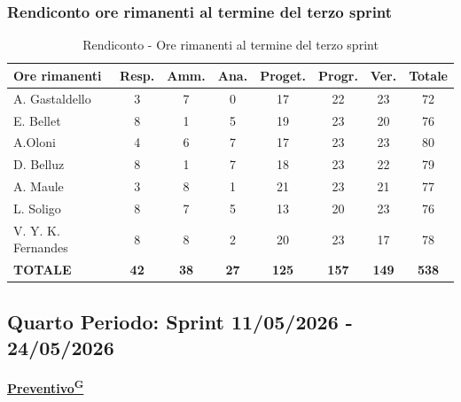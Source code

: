 \documentclass[a4paper,12pt]{article}
\providecommand{\glslink}[2]{\href{https://alittlebyte-19.github.io/Documentazione/glossario.html\#gls-#1}{\underline{#2}\textsuperscript{\scriptsize G}}}
\begin{document}
\subsubsection{Rendiconto ore rimanenti al termine del terzo sprint}
\begin{table}[htbp]
\centering
\renewcommand{\arraystretch}{1.5} 
\begin{tabularx}{\textwidth}{|X|c|c|c|c|c|c|c|}
\hline
\textbf{Ore rimanenti} & \textbf{Resp.} & \textbf{Amm.} & \textbf{Ana.} & \textbf{Proget.} & \textbf{Progr.} & \textbf{Ver.} & \textbf{Totale} \\
\hline
A. Gastaldello & 3 & 7 & 0 & 17 & 22 & 23 & 72 \\
\hline
E. Bellet & 8 & 1 & 5 & 19 & 23 & 20 & 76 \\
\hline
A.Oloni & 4 & 6 & 7 & 17 & 23 & 23 & 80 \\
\hline
D. Belluz & 8 & 1 & 7 & 18 & 23 & 22 & 79 \\
\hline
A. Maule & 3 & 8 & 1 & 21 & 23 & 21 & 77 \\
\hline
L. Soligo & 8 & 7 & 5 & 13 & 20 & 23 & 76 \\
\hline
V. Y. K. Fernandes & 8 & 8 & 2 & 20 & 23 & 17 & 78 \\
\hline
\rowcolor{gray!20}
\textbf{TOTALE} & \textbf{42} & \textbf{38} & \textbf{27} & \textbf{125} & \textbf{157} & \textbf{149} & \textbf{538} \\
\hline
\end{tabularx}
\caption{Rendiconto - Ore rimanenti al termine del terzo sprint}
\end{table}

\newpage
\subsection{Quarto Periodo: Sprint 11/05/2026 - 24/05/2026}
\label{sec:pec_quartoperiodo}

\vspace{0.5em}

\begin{center}
\noindent\textbf{\glslink{preventivo}{Preventivo}}
\end{center}
\end{document}
